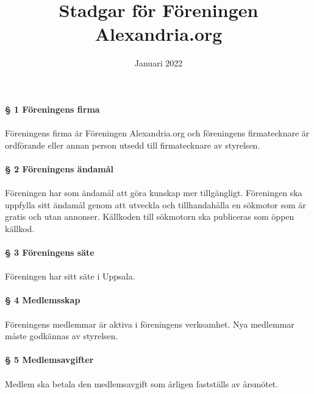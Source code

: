 \documentclass[12pt, a4paper]{article}
\title{Stadgar för Föreningen Alexandria.org}
\date{Januari 2022}
\begin{document}
\maketitle

\paragraph{§ 1 Föreningens firma}
\paragraph{}
Föreningens firma är Föreningen Alexandria.org och föreningens firmatecknare är ordförande eller annan person utsedd till firmatecknare av styrelsen.

\paragraph{§ 2 Föreningens ändamål}
\paragraph{}
Föreningen har som ändamål att göra kunskap mer tillgängligt. Föreningen ska uppfylla sitt ändamål genom att utveckla och tillhandahålla en sökmotor som är gratis och utan annonser. Källkoden till sökmotorn ska publiceras som öppen källkod.

\paragraph{§ 3 Föreningens säte}
\paragraph{}
Föreningen har sitt säte i Uppsala.

\paragraph{§ 4 Medlemsskap}
\paragraph{}
Föreningens medlemmar är aktiva i föreningens verksamhet. Nya medlemmar måste godkännas av styrelsen.

\paragraph{§ 5 Medlemsavgifter}
\paragraph{}
Medlem ska betala den medlemsavgift som årligen fastställs av årsmötet.
\end{document}

